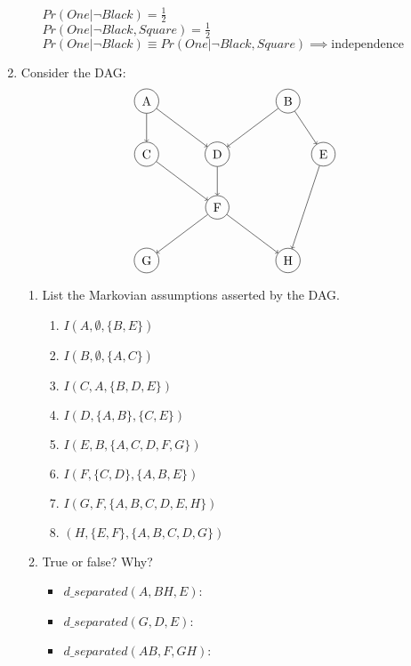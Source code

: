 \documentclass[10.5pt,letterpaper]{article}
\begin{document}
\begin{enumerate}[label=\textbf{Problem \arabic*.}]
\begin{enumerate}[label=\arabic*)]
	$Pr(One|\lnot Black) = \frac{1}{2}$\\
	$Pr(One|\lnot Black,Square) = \frac{1}{2}$\\
	$Pr(One|\lnot Black) \equiv Pr(One|\lnot Black,Square) \implies \text{independence}$
	\end{enumerate} 
\item Consider the DAG:
\[\begin{tikzpicture}
	\node[shape=circle,draw=black](A) at (0,0) {A};
	\node[shape=circle,draw=black](B) at (4,0) {B};
	\node[shape=circle,draw=black](C) at (0,-1.5) {C};
	\node[shape=circle,draw=black](D) at (2,-1.5) {D};
	\node[shape=circle,draw=black](E) at (5,-1.5) {E};
	\node[shape=circle,draw=black](F) at (2,-3) {F};
	\node[shape=circle,draw=black](G) at (0,-4.5) {G};
	\node[shape=circle,draw=black](H) at (4,-4.5) {H};
	\path[->](A) edge node {} (C)
		edge node {} (D);
	\path[->](B) edge node {} (D)
		edge node {} (E);
	\path[->](C) edge node {} (F);
	\path[->](D) edge node {} (F);
	\path[->](E) edge node {} (H);
	\path[->](F) edge node {} (G)
		edge node {} (H);
\end{tikzpicture}\]
	\begin{enumerate}[label=(\alph*)]
	\item List the Markovian assumptions asserted by the DAG.
	\begin{enumerate}[label=\arabic*)]
	\item $I(A,\emptyset,\{B,E\})$
	\item $I(B,\emptyset,\{A,C\})$
	\item $I(C,A,\{B,D,E\})$
	\item $I(D,\{A,B\},\{C,E\})$
	\item $I(E,B,\{A,C,D,F,G\})$
	\item $I(F,\{C,D\},\{A,B,E\})$
	\item $I(G,F,\{A,B,C,D,E,H\})$
	\item $(H,\{E,F\},\{A,B,C,D,G\})$
	\end{enumerate}
	\item True or false? Why?
		\begin{itemize}
			\item $d\_separated(A,BH,E)$: 
			\item $d\_separated(G,D,E)$: 
			\item $d\_separated(AB,F,GH)$: 

\end{itemize}
\end{enumerate}
\end{enumerate}
\end{document}
